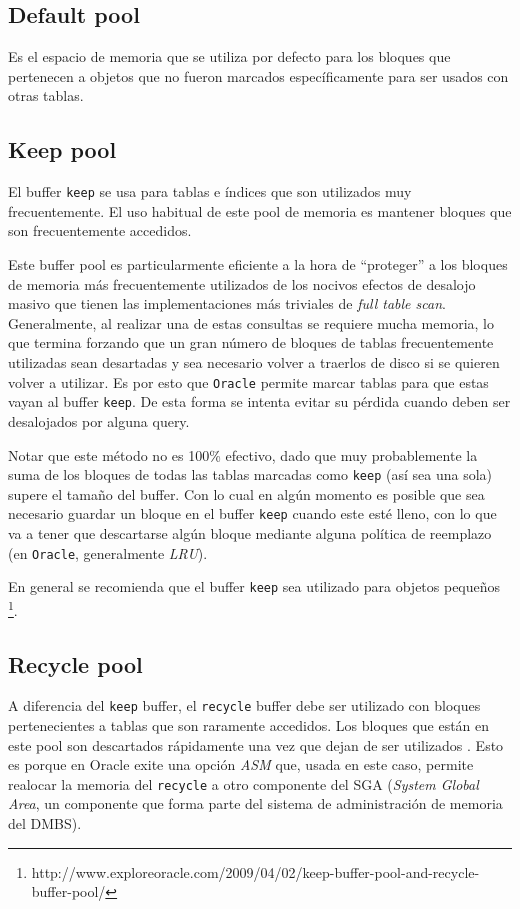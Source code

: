 \subsection{Default pool}
Es el espacio de memoria que se utiliza por defecto para los bloques que pertenecen a objetos que no fueron marcados específicamente para ser usados con otras tablas.

\subsection{Keep pool}
El buffer \texttt{keep} se usa para tablas e índices que son utilizados muy frecuentemente. El uso habitual de este pool de memoria es mantener bloques que son frecuentemente accedidos. 

Este buffer pool es particularmente eficiente a la hora de ``proteger'' a los bloques de memoria más frecuentemente utilizados de los nocivos efectos de desalojo masivo que tienen las implementaciones más triviales de \textit{full table scan}. Generalmente, al realizar una de estas consultas se requiere mucha memoria, lo que termina forzando que un gran número de bloques de tablas frecuentemente utilizadas sean desartadas y sea necesario volver a traerlos de disco si se quieren volver a utilizar. Es por esto que \texttt{Oracle} permite marcar tablas para que estas vayan al buffer \texttt{keep}. De esta forma se intenta evitar su pérdida cuando deben ser desalojados por alguna query.

Notar que este método no es 100\% efectivo, dado que muy probablemente la suma de los bloques de todas las tablas marcadas como \texttt{keep} (así sea una sola) supere el tamaño del buffer. Con lo cual en algún momento es posible que sea necesario guardar un bloque en el buffer \texttt{keep} cuando este esté lleno, con lo que va a tener que descartarse algún bloque mediante alguna política de reemplazo (en \texttt{Oracle}, generalmente \textit{LRU}). 

En general se recomienda que el buffer \texttt{keep} sea utilizado para objetos pequeños \footnote{http://www.exploreoracle.com/2009/04/02/keep-buffer-pool-and-recycle-buffer-pool/}.

\subsection{Recycle pool}
A diferencia del \texttt{keep} buffer, el \texttt{recycle} buffer debe ser utilizado con bloques pertenecientes a tablas que son raramente accedidos. Los bloques que están en este pool son descartados rápidamente una vez que dejan de ser utilizados \footnotemark[\value{footnote}]. Esto es porque en Oracle exite una opción \textit{ASM} que, usada en este caso, permite realocar la memoria del \texttt{recycle} a otro componente del SGA (\textit{System Global Area}, un componente que forma parte del sistema de administración de memoria del DMBS).

